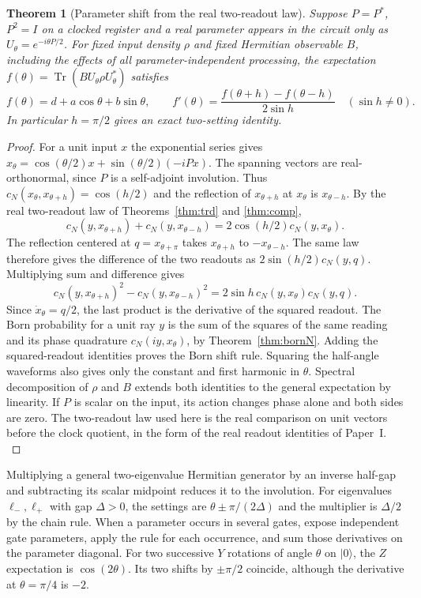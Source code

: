 \documentclass[aps,pra,onecolumn,superscriptaddress,nofootinbib,10pt]{revtex4-2}
\newtheorem{theorem}{Theorem}
\theoremstyle{definition}
\theoremstyle{remark}
\begin{document}
\begin{theorem}[Parameter shift from the real two-readout law]\label{cp:shift}
Suppose $P=P^*$, $P^2=I$ on a clocked register and a real parameter appears in the circuit only as $U_\theta=e^{-i\theta P/2}$. For fixed input density $\rho$ and fixed Hermitian observable $B$, including the effects of all parameter-independent processing, the expectation
$f(\theta)=\operatorname{Tr}(B U_\theta\rho U_\theta^*)$ satisfies
\[
 f(\theta)=d+a\cos\theta+b\sin\theta,\qquad
 f'(\theta)=\frac{f(\theta+h)-f(\theta-h)}{2\sin h}
 \quad(\sin h\ne0).
\]
In particular $h=\pi/2$ gives an exact two-setting identity. \cite{n5-shift-ref}
\end{theorem}
\begin{proof}
For a unit input $x$ the exponential series gives $x_\theta=\cos(\theta/2)x+\sin(\theta/2)(-iPx)$. The spanning vectors are real-orthonormal, since $P$ is a self-adjoint involution. Thus $c_N(x_\theta,x_{\theta+h})=\cos(h/2)$ and the reflection of $x_{\theta+h}$ at $x_\theta$ is $x_{\theta-h}$. By the real two-readout law of Theorems~\ref{thm:trd} and \ref{thm:comp},
\[
 c_N(y,x_{\theta+h})+c_N(y,x_{\theta-h})
 =2\cos(h/2)c_N(y,x_\theta).
\]
The reflection centered at $q=x_{\theta+\pi}$ takes $x_{\theta+h}$ to $-x_{\theta-h}$. The same law therefore gives the difference of the two readouts as $2\sin(h/2)c_N(y,q)$. Multiplying sum and difference gives
\[
 c_N(y,x_{\theta+h})^2-c_N(y,x_{\theta-h})^2
 =2\sin h\,c_N(y,x_\theta)c_N(y,q).
\]
Since $\dot x_\theta=q/2$, the last product is the derivative of the squared readout. The Born probability for a unit ray $y$ is the sum of the squares of the same reading and its phase quadrature $c_N(iy,x_\theta)$, by Theorem~\ref{thm:bornN}. Adding the squared-readout identities proves the Born shift rule. Squaring the half-angle waveforms also gives only the constant and first harmonic in $\theta$. Spectral decomposition of $\rho$ and $B$ extends both identities to the general expectation by linearity. If $P$ is scalar on the input, its action changes phase alone and both sides are zero. The two-readout law used here is the real comparison on unit vectors before the clock quotient, in the form of the real readout identities of Paper~I. \cite{PaperI}
\end{proof}

Multiplying a general two-eigenvalue Hermitian generator by an inverse half-gap and subtracting its scalar midpoint reduces it to the involution. For eigenvalues $\ell_-,\ell_+$ with gap $\Delta>0$, the settings are $\theta\pm\pi/(2\Delta)$ and the multiplier is $\Delta/2$ by the chain rule. When a parameter occurs in several gates, expose independent gate parameters, apply the rule for each occurrence, and sum those derivatives on the parameter diagonal. For two successive $Y$ rotations of angle $\theta$ on $|0\rangle$, the $Z$ expectation is $\cos(2\theta)$. Its two shifts by $\pm\pi/2$ coincide, although the derivative at $\theta=\pi/4$ is $-2$.
\end{document}
